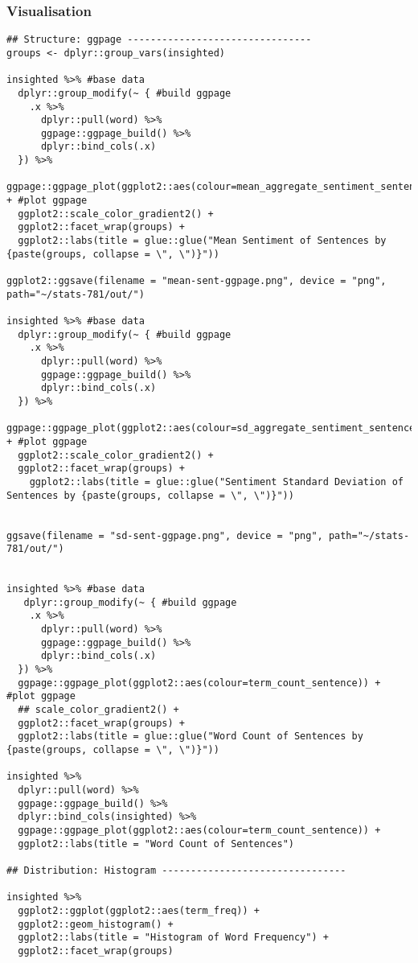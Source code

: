 \documentclass[a4paper, 11pt]{article}
\begin{document}
\subsubsection{Visualisation}
\label{sec:org8525b6d}
\begin{verbatim}
## Structure: ggpage --------------------------------
groups <- dplyr::group_vars(insighted)

insighted %>% #base data
  dplyr::group_modify(~ { #build ggpage
    .x %>%
      dplyr::pull(word) %>%
      ggpage::ggpage_build() %>%
      dplyr::bind_cols(.x)  
  }) %>%
  ggpage::ggpage_plot(ggplot2::aes(colour=mean_aggregate_sentiment_sentence)) + #plot ggpage
  ggplot2::scale_color_gradient2() +
  ggplot2::facet_wrap(groups) +
  ggplot2::labs(title = glue::glue("Mean Sentiment of Sentences by {paste(groups, collapse = \", \")}"))

ggplot2::ggsave(filename = "mean-sent-ggpage.png", device = "png", path="~/stats-781/out/")

insighted %>% #base data
  dplyr::group_modify(~ { #build ggpage
    .x %>%
      dplyr::pull(word) %>%
      ggpage::ggpage_build() %>%
      dplyr::bind_cols(.x)  
  }) %>%
  ggpage::ggpage_plot(ggplot2::aes(colour=sd_aggregate_sentiment_sentence)) + #plot ggpage
  ggplot2::scale_color_gradient2() +
  ggplot2::facet_wrap(groups) +
    ggplot2::labs(title = glue::glue("Sentiment Standard Deviation of Sentences by {paste(groups, collapse = \", \")}"))


ggsave(filename = "sd-sent-ggpage.png", device = "png", path="~/stats-781/out/")


insighted %>% #base data
   dplyr::group_modify(~ { #build ggpage
    .x %>%
      dplyr::pull(word) %>%
      ggpage::ggpage_build() %>%
      dplyr::bind_cols(.x)  
  }) %>%
  ggpage::ggpage_plot(ggplot2::aes(colour=term_count_sentence)) + #plot ggpage
  ## scale_color_gradient2() +
  ggplot2::facet_wrap(groups) +
  ggplot2::labs(title = glue::glue("Word Count of Sentences by {paste(groups, collapse = \", \")}"))

insighted %>%
  dplyr::pull(word) %>%
  ggpage::ggpage_build() %>%
  dplyr::bind_cols(insighted) %>%
  ggpage::ggpage_plot(ggplot2::aes(colour=term_count_sentence)) +
  ggplot2::labs(title = "Word Count of Sentences")

## Distribution: Histogram --------------------------------

insighted %>%
  ggplot2::ggplot(ggplot2::aes(term_freq)) +
  ggplot2::geom_histogram() +
  ggplot2::labs(title = "Histogram of Word Frequency") +
  ggplot2::facet_wrap(groups)


\end{verbatim}
\end{document}
